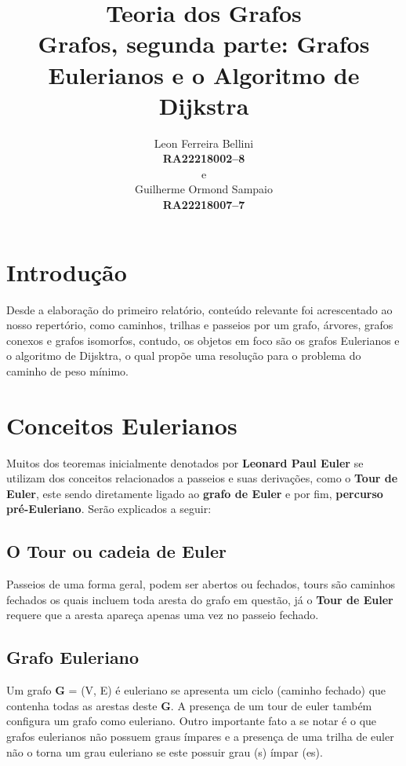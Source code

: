 \documentclass[a4paper, 12pt]{article}
\begin{document}
\title{\textbf{Teoria dos Grafos}\\ \small{Grafos, segunda parte: Grafos Eulerianos e o Algoritmo de Dijkstra}}
\author{Leon Ferreira Bellini\\
	\small{\textbf{RA\@ 22218002--8}}\\
	e\\
   Guilherme Ormond Sampaio\\
   \small{\textbf{RA\@ 22218007--7}}
}
\date{}
\maketitle
\section{Introdução}
Desde a elaboração do primeiro relatório, conteúdo relevante foi acrescentado ao nosso repertório, como caminhos, trilhas e passeios por um grafo, árvores, grafos conexos e grafos isomorfos, contudo, os objetos em foco são os grafos Eulerianos e o algoritmo de Dijsktra, o qual propõe uma resolução para o problema do caminho de peso mínimo.

\section{Conceitos Eulerianos}
Muitos dos teoremas inicialmente denotados por \textbf{Leonard Paul Euler} se utilizam dos conceitos relacionados a passeios e suas derivações, como o \textbf{Tour de Euler}, este sendo diretamente ligado ao \textbf{grafo de Euler} e por fim,  \textbf{percurso pré-Euleriano}. Serão explicados a seguir:

\subsection{O Tour ou cadeia de Euler}
Passeios de uma forma geral, podem ser abertos ou fechados, tours são caminhos fechados os quais incluem toda aresta do grafo em questão, já o \textbf{Tour de Euler} requere que a aresta apareça apenas uma vez no passeio fechado.

\subsection{Grafo Euleriano}

Um grafo \textbf{G} = (V, E) é euleriano se apresenta um ciclo (caminho fechado) que contenha todas as arestas deste \textbf{G}. A presença de um tour de euler também configura um grafo como euleriano. Outro importante fato a se notar é o que grafos eulerianos não possuem graus ímpares e a presença de uma trilha de euler não o torna um grau euleriano se este possuir grau (s) ímpar (es). 
\end{document}
